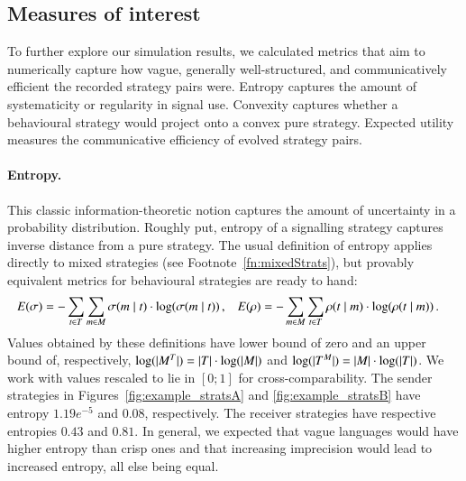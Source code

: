 \documentclass[11pt,english]{article}
\numberwithin{equation}{section}
\begin{document}
\subsection{Measures of interest}
 
To further explore our simulation results, we calculated metrics that aim to numerically
capture how vague, generally well-structured, and communicatively efficient the recorded
strategy pairs were. Entropy captures the amount of systematicity or regularity in signal
use. Convexity captures whether a behavioural strategy would project onto a convex pure
strategy. Expected utility measures the communicative efficiency of evolved strategy pairs.

\paragraph{Entropy.} This classic information-theoretic notion captures the amount of
uncertainty in a probability distribution. Roughly put, entropy of a signalling strategy
captures inverse distance from a pure strategy. The usual definition of entropy applies
directly to mixed strategies (see Footnote~\ref{fn:mixedStrats}), but provably equivalent
metrics for behavioural strategies are ready to hand:
\begin{align*}
  E(\sigma) & = -\sum_{t \in T} \sum_{m \in M}
  \sigma(m \mid t) \cdot \log(\sigma(m \mid
  t))\,, &
  E(\rho) & = -\sum_{m \in M} \sum_{t \in T}
  \rho(t \mid m) \cdot \log(\rho(t \mid
  m)) \,. 
\end{align*}
Values obtained by these definitions have lower bound of zero and an upper bound of,
respectively, $\log(|M^T|) = |T| \cdot \log(|M|)$ and
$\log(|T^M|) = |M| \cdot \log(|T|)$. We work with values rescaled to
lie in $[0;1]$ for cross-comparability. The sender strategies in
Figures~\ref{fig:example_stratsA} and \ref{fig:example_stratsB} have entropy $1.19e^{-5}$ and
$0.08$, respectively. The receiver strategies have respective entropies $0.43$ and $0.81$. In
general, we expected that vague languages would have higher entropy than crisp ones and that
increasing imprecision would lead to increased entropy, all else being equal.
\end{document}
